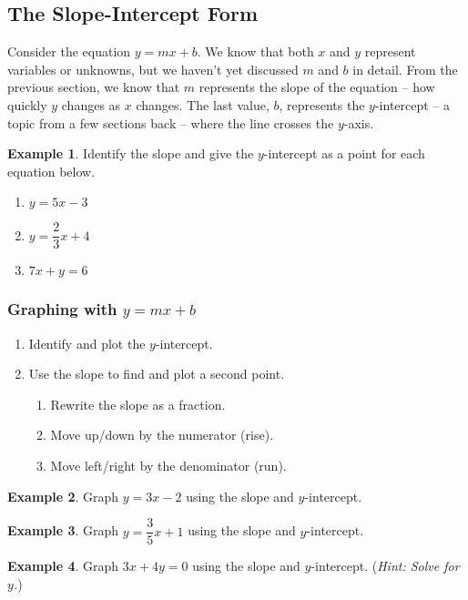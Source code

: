 \documentclass[addpoints,12pt]{exam}
\theoremstyle{definition}
\theoremstyle{break}
\theoremstyle{break}
\newtheorem{example}{Example}[subsection]
\begin{document}
\setcounter{section}{3}
\setcounter{subsection}{3}

\subsection{The Slope-Intercept Form}

\vspace{.15in}

Consider the equation $y = mx + b$. We know that both $x$ and $y$ represent variables or unknowns, but we haven't yet discussed $m$ and $b$ in detail. From the previous section, we know that $m$ represents the slope of the equation -- how quickly $y$ changes as $x$ changes. The last value, $b$, represents the $y$-intercept -- a topic from a few sections back -- where the line crosses the $y$-axis.

\vspace{.15in}

\begin{example}
Identify the slope and give the $y$-intercept as a point for each equation below.
\begin{enumerate}
\item $y = 5x-3$
\vspace{.5in}
\item $y = \dfrac{2}{3}x + 4$
\vspace{.5in}
\item $7x + y = 6$
\vspace{1in}
\end{enumerate}
\end{example}

\subsubsection*{Graphing with $y=mx+b$}
\begin{enumerate}
\item Identify and plot the $y$-intercept.
\item Use the slope to find and plot a second point.
\begin{enumerate}
\item Rewrite the slope as a fraction.
\item Move up/down by the numerator (rise).
\item Move left/right by the denominator (run).
\end{enumerate}
\end{enumerate}

\newpage

\begin{example}
Graph $y = 3x - 2$ using the slope and $y$-intercept.
\vspace{3in}
\end{example}

\begin{example}
Graph $y = \dfrac{3}{5}x + 1$ using the slope and $y$-intercept.
\end{example}

\newpage

\begin{example}
Graph $3x+4y = 0$ using the slope and $y$-intercept. (\emph{Hint: Solve for $y$.})
\end{example}
\end{document}
